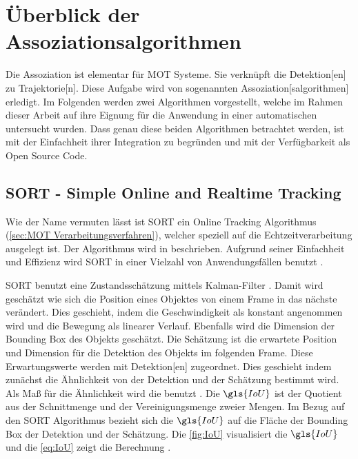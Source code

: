 \section{Überblick der Assoziationsalgorithmen} \label{sec:Überblick Tracker}




Die \gls{Assoziation} ist elementar für \gls{MOT} Systeme. Sie verknüpft die \gls{Detektion}[en] zu \gls{Trajektorie}[n]. Diese Aufgabe wird von sogenannten \gls{Assoziation}[salgorithmen] erledigt. Im Folgenden werden zwei Algorithmen vorgestellt, welche im Rahmen dieser Arbeit auf ihre Eignung für die Anwendung in einer automatischen  untersucht wurden. Dass genau diese beiden Algorithmen betrachtet werden, ist mit der Einfachheit ihrer Integration zu begründen und mit der Verfügbarkeit als Open Source Code. 


\subsection{SORT - Simple Online and Realtime Tracking} \label{sec:MOT SORT}

Wie der Name vermuten lässt ist \acrshort{SORT} ein \gls{Online Tracking} Algorithmus (\autoref{sec:MOT Verarbeitungsverfahren}), welcher speziell auf die Echtzeitverarbeitung ausgelegt ist. Der Algorithmus wird in \cite{Bewley.2016} beschrieben. Aufgrund seiner Einfachheit und Effizienz wird \acrshort{SORT} in einer Vielzahl von Anwendungsfällen benutzt \cite{Chen.2023, Maher.2018, Fedorov.2019}. \par

\acrshort{SORT} benutzt eine Zustandsschätzung mittels Kalman-Filter \cite{Kalman.1960}. Damit wird geschätzt wie sich die Position eines Objektes von einem \gls{Frame} in das nächste verändert. Dies geschieht, indem die Geschwindigkeit als konstant angenommen wird und die Bewegung als linearer Verlauf. Ebenfalls wird die Dimension der \gls{Bounding Box} des Objekts geschätzt. Die Schätzung ist die erwartete Position und Dimension für die \gls{Detektion} des Objekts im folgenden \gls{Frame}. Diese Erwartungswerte werden mit \gls{Detektion}[en] zugeordnet. Dies geschieht indem zunächst die Ähnlichkeit von der \gls{Detektion} und der Schätzung bestimmt wird. Als Maß für die Ähnlichkeit wird die  benutzt  \cite{Bewley.2016}. Die \(\gls{IoU}\) ist der Quotient aus der Schnittmenge und der Vereinigungsmenge zweier Mengen. Im Bezug auf den \acrshort{SORT} Algorithmus bezieht sich die \(\gls{IoU}\) auf die Fläche der \gls{Bounding Box} der \gls{Detektion} und der Schätzung. Die \autoref{fig:IoU} visualisiert die \(\gls{IoU}\) und die \autoref{eq:IoU} zeigt die Berechnung \cite{Rezatofighi.2019}. 

